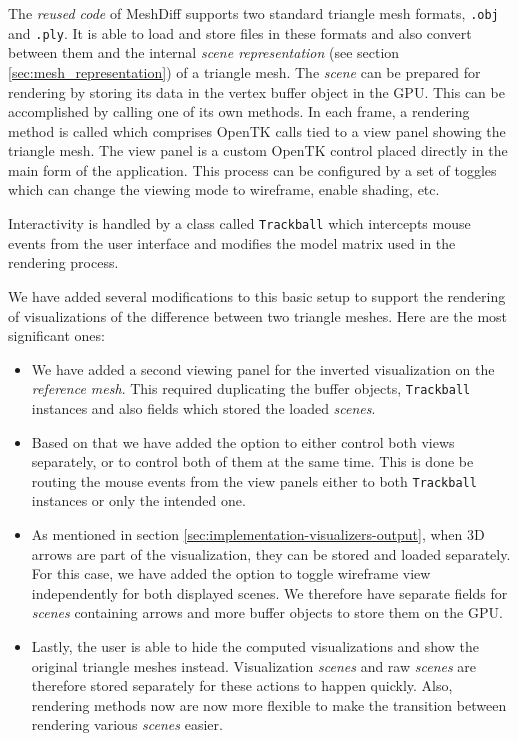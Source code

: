 The {\it reused code} of MeshDiff supports two standard triangle mesh formats, \verb+.obj+ and \verb+.ply+. It is able to load and store files in these formats and also convert between them and the internal {\it scene representation} (see section \ref{sec:mesh_representation}) of a triangle mesh. The {\it scene} can be prepared for rendering by storing its data in the vertex buffer object in the GPU. This can be accomplished by calling one of its own methods. In each frame, a rendering method is called which comprises OpenTK calls tied to a view panel showing the triangle mesh. The view panel is a custom OpenTK control placed directly in the main form of the application. This process can be configured by a set of toggles which can change the viewing mode to wireframe, enable shading, etc.

Interactivity is handled by a class called \verb+Trackball+ which intercepts mouse events from the user interface and modifies the model matrix used in the rendering process.

We have added several modifications to this basic setup to support the rendering of visualizations of the difference between two triangle meshes. Here are the most significant ones:

\begin{itemize}
\item We have added a second viewing panel for the inverted visualization on the {\it reference mesh}. This required duplicating the buffer objects, \verb+Trackball+ instances and also fields which stored the loaded {\it scenes}.
\item Based on that we have added the option to either control both views separately, or to control both of them at the same time. This is done be routing the mouse events from the view panels either to both \verb+Trackball+ instances or only the intended one.
\item As mentioned in section \ref{sec:implementation-visualizers-output}, when 3D arrows are part of the visualization, they can be stored and loaded separately. For this case, we have added the option to toggle wireframe view independently for both displayed scenes. We therefore have separate fields for {\it scenes} containing arrows and more buffer objects to store them on the GPU.
\item Lastly, the user is able to hide the computed visualizations and show the original triangle meshes instead. Visualization {\it scenes} and raw {\it scenes} are therefore stored separately for these actions to happen quickly. Also, rendering methods now are now more flexible to make the transition between rendering various {\it scenes} easier.
\end{itemize}

